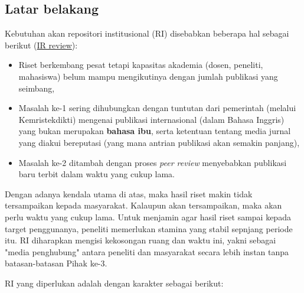 \documentclass[a4paper]{article}
\begin{document}
\subsection{Latar belakang}

Kebutuhan akan repositori institusional (RI) disebabkan beberapa hal sebagai berikut (\href{https://www.slideshare.net/smtch/institutional-repositories-16233657}{IR review}):

\begin{itemize}
\item Riset berkembang pesat tetapi kapasitas akademia (dosen, peneliti, mahasiswa) belum mampu mengikutinya dengan jumlah publikasi yang seimbang,
\item Masalah ke-1 sering dihubungkan dengan tuntutan dari pemerintah (melalui Kemristekdikti) mengenai publikasi internasional (dalam Bahasa Inggris) yang bukan merupakan \textbf{bahasa ibu}, serta ketentuan tentang media jurnal yang diakui bereputasi (yang mana antrian publikasi akan semakin panjang),
\item Masalah ke-2 ditambah dengan proses \textit{peer review} menyebabkan publikasi baru terbit dalam waktu yang cukup lama. 
\end{itemize}

Dengan adanya kendala utama di atas, maka hasil riset makin tidak tersampaikan kepada masyarakat. Kalaupun akan tersampaikan, maka akan perlu waktu yang cukup lama. Untuk menjamin agar hasil riset sampai kepada target penggunanya, peneliti memerlukan stamina yang stabil sepnjang periode itu. RI diharapkan mengisi kekosongan ruang dan waktu ini, yakni sebagai "media penghubung" antara peneliti dan masyarakat secara lebih instan tanpa batasan-batasan Pihak ke-3. 

RI yang diperlukan adalah dengan karakter sebagai berikut:
\end{document}

